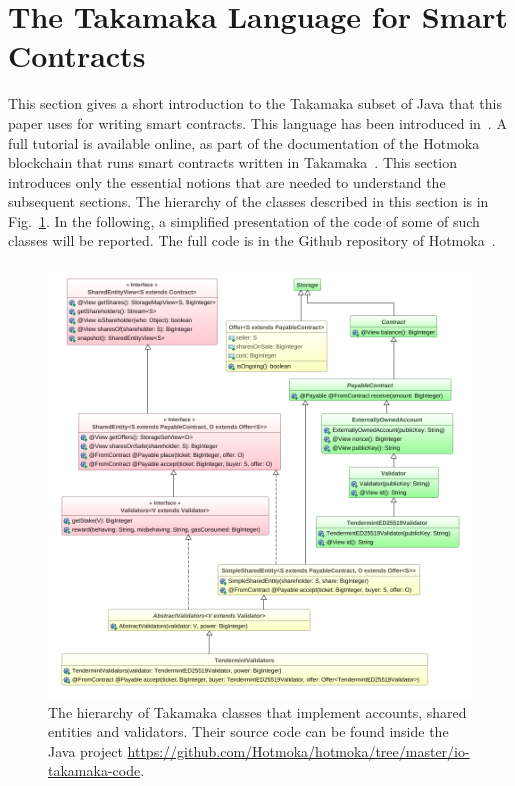 \section{The Takamaka Language for Smart Contracts}\label{sec:takamaka}

This section gives a short introduction to the Takamaka subset of
Java that this paper uses for writing smart contracts.
This language has been introduced in~\cite{Spoto19}. A full tutorial
is available online, as part of the documentation of the Hotmoka
blockchain that runs smart contracts written
in Takamaka~\cite{hotmoka_repository}. This section introduces only
the essential notions that are needed to understand the subsequent sections.
The hierarchy of the classes described in this section is in Fig.~\ref{fig:hierarchy-entities}.
In the following, a simplified presentation of the code of some
of such classes will be reported. The full code is in the Github repository of Hotmoka~\cite{hotmoka_repository}.

\begin{figure}[t]
  \begin{center}
    \includegraphics[width=12.2cm]{entities-hierarchy.png}
  \end{center}
  \caption{The hierarchy of Takamaka classes that implement accounts, shared entities and validators. Their source code can be found inside the Java project \textsf{\url{https://github.com/Hotmoka/hotmoka/tree/master/io-takamaka-code}}.}\label{fig:hierarchy-entities}
\end{figure}

